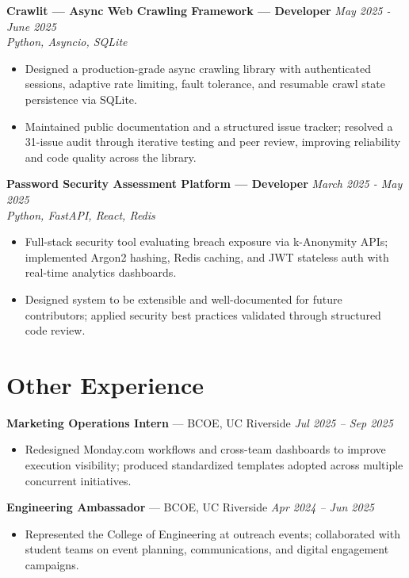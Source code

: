 \documentclass[10.5pt]{article}
\newcommand{\blist}{\begin{itemize}[leftmargin=*,noitemsep,topsep=1pt,parsep=0pt,itemsep=1pt]}
\newcommand{\elist}{\end{itemize}\vspace{3pt}}
\begin{document}
\textbf{Crawlit --- Async Web Crawling Framework  --- Developer} \hfill \textit{May 2025 - June 2025} \\ \hfill \textit{Python, Asyncio, SQLite}
\blist
    \item Designed a production-grade async crawling library with authenticated sessions, adaptive rate limiting, fault tolerance, and resumable crawl state persistence via SQLite.
    \item Maintained public documentation and a structured issue tracker; resolved a 31-issue audit through iterative testing and peer review, improving reliability and code quality across the library.
\elist

\textbf{Password Security Assessment Platform  --- Developer} \hfill \textit{March 2025 - May 2025} \\ \hfill \textit{Python, FastAPI, React, Redis}
\blist
    \item Full-stack security tool evaluating breach exposure via k-Anonymity APIs; implemented Argon2 hashing, Redis caching, and JWT stateless auth with real-time analytics dashboards.
    \item Designed system to be extensible and well-documented for future contributors; applied security best practices validated through structured code review.
\elist

\section*{Other Experience}
\small
\textbf{Marketing Operations Intern} --- BCOE, UC Riverside \hfill \textit{Jul 2025 -- Sep 2025}
\blist
    \item Redesigned Monday.com workflows and cross-team dashboards to improve execution visibility; produced standardized templates adopted across multiple concurrent initiatives.
\elist

\textbf{Engineering Ambassador} --- BCOE, UC Riverside \hfill \textit{Apr 2024 -- Jun 2025}
\blist
    \item Represented the College of Engineering at outreach events; collaborated with student teams on event planning, communications, and digital engagement campaigns.
\elist
\end{document}
